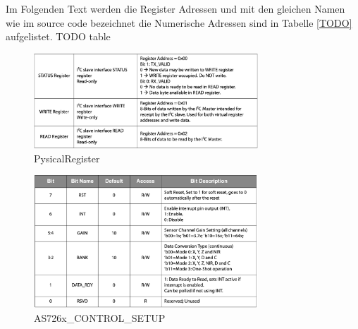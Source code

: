 Im Folgenden Text werden die Register Adressen und mit den gleichen Namen wie im source code bezeichnet die Numerische Adressen sind in Tabelle \ref{TODO} aufgelistet. TODO table

\begin{figure}[H]
\centering
\includegraphics[width=0.75\textwidth]{img/PysicalRegister}
\caption{PysicalRegister}
\label{fig:Seitenasicht-AS726X}
\end{figure}

\begin{figure}[H]
\centering
\includegraphics[width=0.75\textwidth]{img/ControlRegister_2}
\caption{AS726x\_CONTROL\_SETUP}
\label{fig:Seitenasicht-AS726X}
\end{figure}


